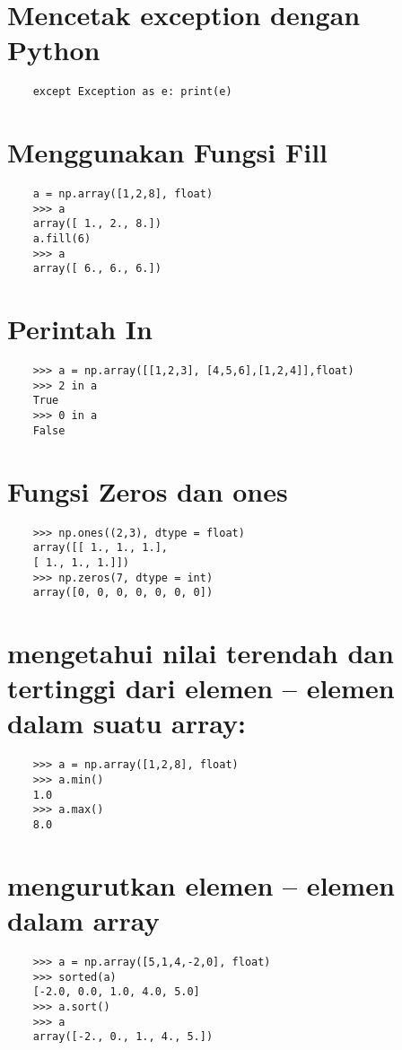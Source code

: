 \documentclass[12pt]{article} %
\begin{document}
\section {Mencetak exception dengan Python}
\begin{lstlisting}
	except Exception as e: print(e)
\end{lstlisting}

\section {Menggunakan Fungsi Fill}
\begin{lstlisting}
	a = np.array([1,2,8], float)
	>>> a
	array([ 1., 2., 8.])
	a.fill(6)
	>>> a
	array([ 6., 6., 6.])
\end{lstlisting}

\section {Perintah In}
\begin{lstlisting}
	>>> a = np.array([[1,2,3], [4,5,6],[1,2,4]],float)
	>>> 2 in a
	True
	>>> 0 in a
	False
\end{lstlisting}

\section {Fungsi Zeros dan ones}
\begin{lstlisting}
	>>> np.ones((2,3), dtype = float)
	array([[ 1., 1., 1.],
	[ 1., 1., 1.]])
	>>> np.zeros(7, dtype = int)
	array([0, 0, 0, 0, 0, 0, 0])
\end{lstlisting}

\section {mengetahui nilai terendah dan tertinggi dari elemen – elemen dalam
suatu array:}
\begin{lstlisting}
	>>> a = np.array([1,2,8], float)
	>>> a.min()
	1.0
	>>> a.max()
	8.0
\end{lstlisting}


\section {mengurutkan elemen – elemen dalam array}
\begin{lstlisting}
	>>> a = np.array([5,1,4,-2,0], float)
	>>> sorted(a)
	[-2.0, 0.0, 1.0, 4.0, 5.0]
	>>> a.sort()
	>>> a
	array([-2., 0., 1., 4., 5.])
\end{lstlisting}
\end{document}
